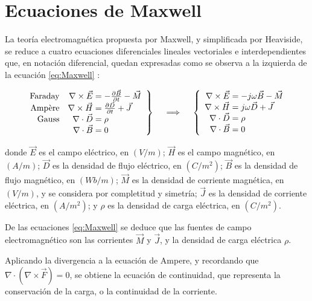 \section{Ecuaciones de Maxwell}
\label{subsec_ecuaciones_maxwell}
La teoría electromagnética propuesta por Maxwell, y simplificada por Heaviside, se reduce a cuatro ecuaciones diferenciales lineales vectoriales e interdependientes que, en notación diferencial, quedan expresadas como se observa a la izquierda de la ecuación \ref{eq:Maxwell} \cite{Pozar:MwEngineering}:

\begin{align}
\label{eq:Maxwell}
\left.\begin{array}{rr@{\mskip\thickmuskip}l}
\text{Faraday} &\nabla \times \vec{E} & = -\frac{\partial \vec{B}}{\partial t} - \vec{M}\\
\text{Ampère} &\nabla \times \vec{H} & = \frac{\partial \vec{D}}{\partial t} + \vec{J} \\
\text{Gauss} &\nabla \cdot \vec{D} & = \rho \\
& \nabla \cdot \vec{B} & = 0
\end{array} \right\}
\quad \implies \quad
\left\{\begin{array}{r@{\mskip\thickmuskip}l}
\nabla \times \vec{E} & = -j \omega \vec{B} - \vec{M} \\
\nabla \times \vec{H} & = j \omega \vec{D} + \vec{J} \\
\nabla \cdot \vec{D} & = \rho\\
\nabla \cdot \vec{B} & = 0
\end{array}\right.
\end{align}

donde $\vec{E}$ es el campo eléctrico, en $(V/m)$; $\vec{H}$ es el campo magnético, en $(A/m)$; $\vec{D}$ es la densidad de flujo eléctrico, en $(C/m^2)$; $\vec{B}$ es la densidad de flujo magnético, en $(Wb/m)$; $\vec{M}$ es la densidad de corriente magnética, en $(V/m)$, y se considera por completitud y simetría; $\vec{J}$ es la densidad de corriente eléctrica, en $(A/m^2)$; y $\rho$ es la densidad de carga eléctrica, en $(C/m^2)$.

De las ecuaciones \ref{eq:Maxwell} se deduce que las fuentes de campo electromagnético son las corrientes $\vec{M}$ y $\vec{J}$, y la densidad de carga eléctrica $\rho$.

Aplicando la divergencia a la ecuación de Ampere, y recordando que $\nabla \cdot (\nabla \times \vec{F}) = 0$, se obtiene la ecuación de continuidad, que representa la conservación de la carga, o la continuidad de la corriente.

